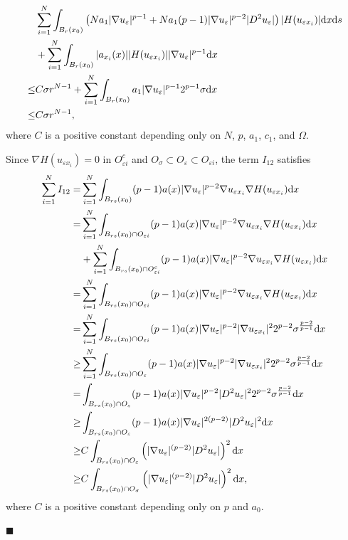 \documentclass[onecolumn]{autart}
\newenvironment{proof}{{\it Proof: \enspace}}{\hfill $\blacksquare$\par}
\begin{document}
\begin{proof}
\begin{align}
			& \sum_{i=1}^{N} \int_{B_{r}(x_0)}\left( N a_1 |\nabla u_\varepsilon|^{p-1} + Na_1(p-1)|\nabla u_\varepsilon|^{p-2} |D^2 u_\varepsilon| \right)  |H(u_{\varepsilon x_i})| \mathrm{d}x\mathrm{d}s
			\notag\\
			&+  \sum_{i=1}^{N}  \int_{ B_{ r}(x_0)} |a_{x_i}(x)|  |H(u_{\varepsilon x_i})||\nabla u_\varepsilon|^{p-1}     \mathrm{d}x
			\notag\\ \leq
			& C \sigma r^{N-1}  + \sum_{i=1}^{N}  \int_{ B_{ r}(x_0)}a_1  |\nabla u_\varepsilon|^{p-1} 2^{p-1}\sigma \mathrm{d}x
			\notag\\ \leq
			& C \sigma r^{N-1} , \label{7.9}
		\end{align}
		where $C$ is a positive  constant  depending only on $N$, $p$, $a_1$,  $c_1$,    and $\Omega$.
		
		Since $\nabla H(u_{\varepsilon x_i}) = 0$ in $O_{\varepsilon i}^c$ and $O_\sigma \subset O_\varepsilon \subset O_{\varepsilon i}$, the term $I_{12}$ satisfies
		\begin{align}
			\sum_{i=1}^{N} I_{12}
			=
			&\sum_{i=1}^{N} \int_{B_{rs}(x_0)} (p-1) a(x)  |\nabla u_\varepsilon|^{p-2} \nabla u_{\varepsilon x_i}\nabla H(u_{\varepsilon x_i}) \mathrm{d}x
			\notag\\ =
			&\sum_{i=1}^{N} \int_{B_{rs}(x_0)\cap O_{\varepsilon i} } (p-1) a(x)  |\nabla u_\varepsilon|^{p-2} \nabla u_{\varepsilon x_i}\nabla H(u_{\varepsilon x_i}) \mathrm{d}x
			\notag\\
			&+ \sum_{i=1}^{N} \int_{B_{rs}(x_0)\cap O_{\varepsilon i}^c } (p-1) a(x)  |\nabla u_\varepsilon|^{p-2} \nabla u_{\varepsilon x_i}\nabla H(u_{\varepsilon x_i}) \mathrm{d}x
			\notag\\=
			&\sum_{i=1}^{N} \int_{B_{rs}(x_0)\cap O_{\varepsilon i} } (p-1) a(x)  |\nabla u_\varepsilon|^{p-2} \nabla u_{\varepsilon x_i}\nabla H(u_{\varepsilon x_i}) \mathrm{d}x
			\notag\\ =
			&\sum_{i=1}^{N} \int_{B_{rs}(x_0)\cap O_{\varepsilon i} } (p-1) a(x)  |\nabla u_\varepsilon|^{p-2} |\nabla u_{\varepsilon x_i}|^2 2^{p-2}\sigma^{\frac{p-2}{p-1}} \mathrm{d}x
			\notag\\ \geq
			&\sum_{i=1}^{N} \int_{B_{rs}(x_0)\cap O_{\varepsilon } } (p-1) a(x)  |\nabla u_\varepsilon|^{p-2} |\nabla u_{\varepsilon x_i}|^2 2^{p-2}\sigma^{\frac{p-2}{p-1}} \mathrm{d}x
			\notag\\ =
			& \int_{B_{rs}(x_0)\cap O_{\varepsilon } } (p-1) a(x)  |\nabla u_\varepsilon|^{p-2} |D^2 u_{\varepsilon }|^2 2^{p-2}\sigma^{\frac{p-2}{p-1}} \mathrm{d}x
			\notag\\ \geq
			& \int_{B_{rs}(x_0)\cap O_{\varepsilon } } (p-1) a(x)  |\nabla u_\varepsilon|^{2(p-2)} |D^2 u_{\varepsilon }|^2 \mathrm{d}x
			\notag\\ \geq
			& C\int_{B_{rs}(x_0)\cap O_{\varepsilon } }   \left( |\nabla u_\varepsilon|^{(p-2)} |D^2 u_{\varepsilon }| \right) ^2\mathrm{d}x
			\notag\\ \geq
			& C\int_{B_{rs}(x_0)\cap O_{\sigma} }   \left( |\nabla u_\varepsilon|^{(p-2)} |D^2 u_{\varepsilon }| \right) ^2\mathrm{d}x ,\label{7.10}
		\end{align}
		{where $C$ is a positive  constant  depending only on  $p$ and $a_0$.}
		

\end{proof}
\end{document}
